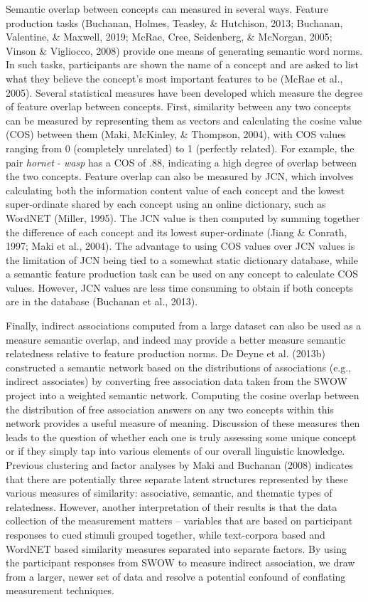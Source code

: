 \documentclass[english,,man]{apa6}
\begin{document}
Semantic overlap between concepts can measured in several ways. Feature production tasks (Buchanan, Holmes, Teasley, \& Hutchison, 2013; Buchanan, Valentine, \& Maxwell, 2019; McRae, Cree, Seidenberg, \& McNorgan, 2005; Vinson \& Vigliocco, 2008) provide one means of generating semantic word norms. In such tasks, participants are shown the name of a concept and are asked to list what they believe the concept's most important features to be (McRae et al., 2005). Several statistical measures have been developed which measure the degree of feature overlap between concepts. First, similarity between any two concepts can be measured by representing them as vectors and calculating the cosine value (COS) between them (Maki, McKinley, \& Thompson, 2004), with COS values ranging from 0 (completely unrelated) to 1 (perfectly related). For example, the pair \emph{hornet} - \emph{wasp} has a COS of .88, indicating a high degree of overlap between the two concepts. Feature overlap can also be measured by JCN, which involves calculating both the information content value of each concept and the lowest super-ordinate shared by each concept using an online dictionary, such as WordNET (Miller, 1995). The JCN value is then computed by summing together the difference of each concept and its lowest super-ordinate (Jiang \& Conrath, 1997; Maki et al., 2004). The advantage to using COS values over JCN values is the limitation of JCN being tied to a somewhat static dictionary database, while a semantic feature production task can be used on any concept to calculate COS values. However, JCN values are less time consuming to obtain if both concepts are in the database (Buchanan et al., 2013).

Finally, indirect associations computed from a large dataset can also be used as a measure semantic overlap, and indeed may provide a better measure semantic relatedness relative to feature production norms. De Deyne et al. (2013b) constructed a semantic network based on the distributions of associations (e.g., indirect associates) by converting free association data taken from the SWOW project into a weighted semantic network. Computing the cosine overlap between the distribution of free association answers on any two concepts within this network provides a useful measure of meaning. Discussion of these measures then leads to the question of whether each one is truly assessing some unique concept or if they simply tap into various elements of our overall linguistic knowledge. Previous clustering and factor analyses by Maki and Buchanan (2008) indicates that there are potentially three separate latent structures represented by these various measures of similarity: associative, semantic, and thematic types of relatedness. However, another interpretation of their results is that the data collection of the measurement matters -- variables that are based on participant responses to cued stimuli grouped together, while text-corpora based and WordNET based similarity measures separated into separate factors. By using the participant responses from SWOW to measure indirect association, we draw from a larger, newer set of data and resolve a potential confound of conflating measurement techniques.
\end{document}
